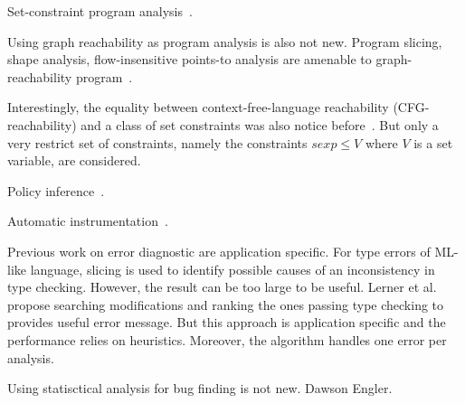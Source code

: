 Set-constraint program analysis~\cite{aiken-setconstraint}.

Using graph reachability as program analysis is also not
new. Program slicing, shape analysis, flow-insensitive points-to
analysis are amenable to graph-reachability program~\cite{reps-graph}.

Interestingly, the equality between context-free-language reachability
(CFG-reachability) and a class of set constraints was also notice
before~\cite{melski-cflgraph}. But only a very restrict set of
constraints, namely the constraints $sexp \leq V$ where $V$ is a
set variable, are considered.

Policy inference~\cite{chong:sp11, harris:ccs10}.

Automatic instrumentation~\cite{king:esop10}.

Previous work on error diagnostic are application specific. For type errors of
ML-like language, slicing is used to identify possible causes of an
inconsistency in type checking. However, the result can be too large to be
useful. Lerner et al.~\cite{lerner:pldi07} propose searching modifications and
ranking the ones passing type checking to provides useful error message. But
this approach is application specific and the performance relies on heuristics. Moreover, the algorithm handles one error per analysis.

Using statisctical
analysis for bug finding is not new. Dawson Engler.





